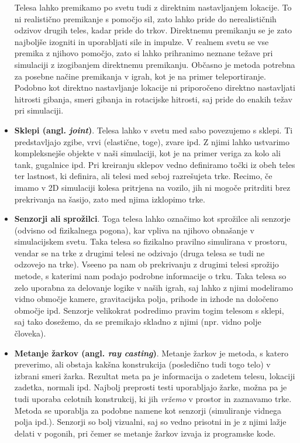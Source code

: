 \documentclass[12pt,a4paper,twoside]{book}
\begin{document}
\begin{itemize}
	Telesa lahko premikamo po svetu tudi z direktnim nastavljanjem lokacije. To ni realistično premikanje s pomočjo sil, zato lahko pride do nerealističnih odzivov drugih teles, kadar pride do trkov. Direktnemu premikanju se je zato najboljše izogniti in uporabljati sile in impulze. V realnem svetu se vse premika z njihovo pomočjo, zato si lahko prihranimo neznane težave pri simulaciji z izogibanjem direktnemu premikanju. Občasno je metoda potrebna za posebne načine premikanja v igrah, kot je na primer teleportiranje. Podobno kot direktno nastavljanje lokacije ni priporočeno direktno nastavljati hitrosti gibanja, smeri gibanja in rotacijske hitrosti, saj pride do enakih težav pri simulaciji.
	\item \textbf{Sklepi (angl. \textit{joint})}. Telesa lahko v svetu med sabo povezujemo s sklepi. Ti predstavljajo zgibe, vrvi (elastične, toge), zvare ipd. Z njimi lahko ustvarimo kompleksnejše objekte v naši simulaciji, kot je na primer veriga za kolo ali tank, gugalnice ipd.  Pri kreiranju sklepov vedno definiramo točki iz obeh teles ter lastnost, ki definira, ali telesi med seboj razrešujeta trke. Recimo, če imamo v 2D simulaciji kolesa pritrjena na vozilo, jih ni mogoče pritrditi brez prekrivanja na šasijo, zato med njima izklopimo trke.
	\item \textbf{Senzorji ali sprožilci}. Toga telesa lahko označimo kot sprožilce ali senzorje (odvisno od fizikalnega pogona), kar vpliva na njihovo obnašanje v simulacijskem svetu. Taka telesa so fizikalno pravilno simulirana v prostoru, vendar se na trke z drugimi telesi ne odzivajo (druga telesa se tudi ne odzovejo na trke). Vseeno pa nam ob prekrivanju z drugimi telesi sprožijo metode, s katerimi nam podajo podrobne informacije o trku. Taka telesa so zelo uporabna za delovanje logike v naših igrah, saj lahko z njimi modeliramo vidno območje kamere, gravitacijska polja, prihode in izhode na določeno območje ipd. Senzorje velikokrat podredimo pravim togim telesom s sklepi, saj tako dosežemo, da se premikajo skladno z njimi (npr. vidno polje človeka).
	\item \textbf{Metanje žarkov (angl. \textit{ray casting})}. Metanje žarkov je metoda, s katero preverimo, ali obstaja kakšna konstrukcija (posledično tudi togo telo) v izbrani smeri žarka. Rezultat meta pa je informacija o zadetem telesu, lokaciji zadetka, normali ipd. Najbolj preprosti testi uporabljajo žarke, možna pa je tudi uporaba celotnih konstrukcij, ki jih \textit{vržemo} v prostor in zaznavamo trke. Metoda se uporablja za podobne namene kot senzorji (simuliranje vidnega polja ipd.). Senzorji so bolj vizualni, saj so vedno prisotni in je z njimi lažje delati v pogonih, pri čemer se metanje žarkov izvaja iz programske kode.
\end{itemize}
\end{document}
